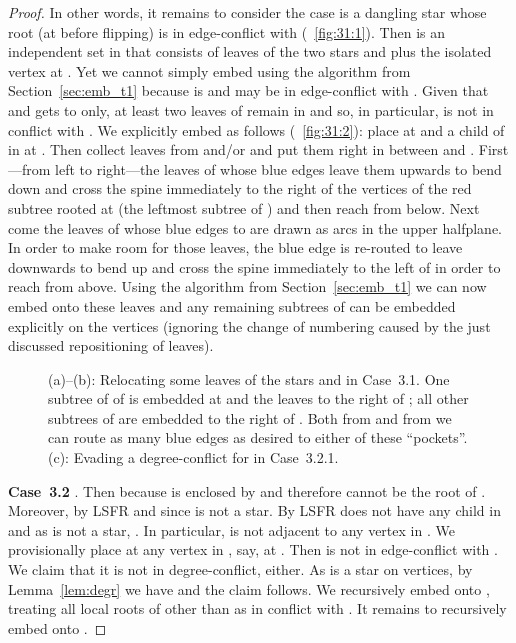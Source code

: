 \documentclass[11pt,a4paper,colorlinks=true,urlcolor=blue,citecolor=red]{article}
\theoremstyle{plain}
\newcommand{\case}[1]{\par\vspace{.5\baselineskip}\noindent\textbf{\sffamily Case~#1}}
\begin{document}
\begin{proof}
  In other words, it remains to consider the case  is a dangling star whose root  (at
   before flipping) is in edge-conflict with 
  (\figurename~\ref{fig:31:1}).
Then  is an independent set in  that consists of leaves of
  the two stars  and  plus the isolated vertex at . Yet we
  cannot simply embed  using the algorithm from
  Section~\ref{sec:emb_t1} because  is and  may be in
  edge-conflict with . Given that  and  gets to
   only, at least two leaves of  remain in  and so, in
  particular,  is not in conflict with . We explicitly embed
   as follows (\figurename~\ref{fig:31:2}): place  at  and
  a child  of  in  at . Then collect  leaves
  from  and/or  and put them right in between  and .
  First---from left to right---the leaves of  whose blue edges leave
  them upwards to bend down and cross the spine immediately to the right
  of the vertices of the red subtree rooted at  (the leftmost subtree of ) and then
  reach  from below. Next come the leaves of  whose blue edges to
   are drawn as arcs in the upper halfplane. In order to make room
  for those leaves, the blue edge  is re-routed to leave 
  downwards to bend up and cross the spine immediately to the left of
   in order to reach  from above. Using the algorithm from
  Section~\ref{sec:emb_t1} we can now embed  onto these leaves
  and any remaining subtrees of  can be embedded explicitly
  on the vertices  (ignoring the change of numbering caused
  by the just discussed repositioning of leaves).
\begin{figure}[htbp]
    \centering \subfloat[]{\texttt{[image: c31-0]}\label{fig:31:1}}\hfil
    \subfloat[]{\texttt{[image: c31-1]}\label{fig:31:2}}\hfil
    \subfloat[]{\texttt{[image: c3221]}\label{fig:gen_322}}\hfil
    \caption{(a)--(b): Relocating some leaves of the stars
       and  in Case~3.1. One subtree of
       of  is embedded at  and the leaves to the right
      of ; all other subtrees of  are embedded to the right of
      . Both from  and from  we can route as many blue edges
      as desired to either of these ``pockets''. (c): Evading a
      degree-conflict for  in Case~3.2.1.\label{fig:31}}
  \end{figure}


  \case{3.2} . Then  because  is enclosed
  by  and therefore cannot be the root of . Moreover,
   by LSFR and since  is not a star. By LSFR  does
  not have any child in  and as  is not a
  star, . In particular,  is not adjacent to
  any vertex in . We provisionally place  at any
  vertex in , say, at . Then  is
  not in edge-conflict with . We claim that it is not in
  degree-conflict, either. As  is a star on  vertices,
  by Lemma~\ref{lem:degr} we have
   and the
  claim follows. We recursively embed  onto ,
  treating all local roots of  other than  as in conflict with
  . It remains to recursively embed  onto .


\end{proof}
\end{document}
